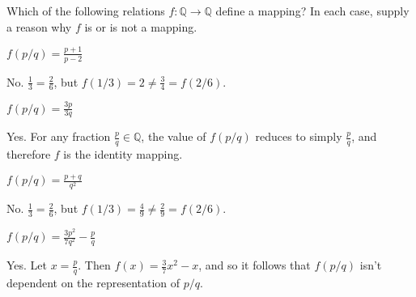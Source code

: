 \section{}\label{sec:17}

Which of the following relations $f:\mathbb{Q} \rightarrow \mathbb{Q}$ define a mapping? In each case, supply a reason why $f$ is or is not a mapping.
\hr
\begin{exlist}
    \item $f(p/q) = \frac{p + 1}{p - 2}$

    No. $\frac{1}{3} = \frac{2}{6}$, but $f(1/3) = 2 \neq \frac{3}{4} = f(2/6)$.

    \item $f(p/q) = \frac{3p}{3q}$

    Yes. For any fraction $\frac{p}{q} \in \mathbb{Q}$, the value of $f(p/q)$ reduces to simply $\frac{p}{q}$, and therefore $f$ is the identity mapping.

    \item $f(p/q) = \frac{p + q}{q^2}$

    No. $\frac{1}{3} = \frac{2}{6}$, but $f(1/3) = \frac{4}{9} \neq \frac{2}{9} = f(2/6)$.

    \item $f(p/q) = \frac{3p^2}{7q^2} - \frac{p}{q}$

    Yes. Let $x = \frac{p}{q}$. Then $f(x) = \frac{3}{7}x^2 - x$, and so it follows that $f(p/q)$ isn't dependent on the representation of $p/q$.
\end{exlist}

\section{}\label{sec:18}

